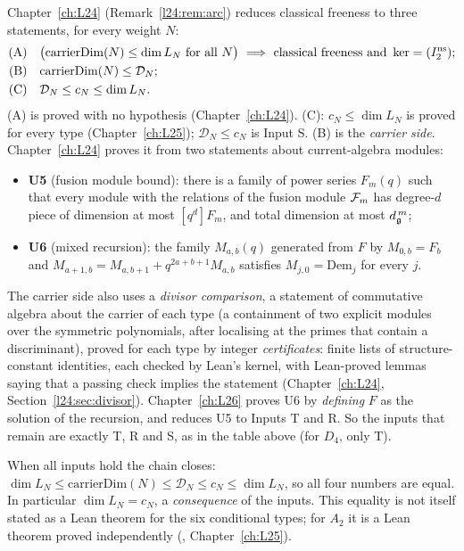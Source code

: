 \begin{remark}\label{l27:rem:arc}
Chapter~\ref{ch:L24} (Remark~\ref{l24:rem:arc}) reduces classical freeness to three statements, for every weight $N$:
\begin{align*}
\text{(A)}\quad & \bigl(\mathrm{carrierDim}(N)\le\dim L_N\ \text{for all }N\bigr)\ \Longrightarrow\ \text{classical freeness and}
\ \ker=(I_2^{\mathrm{ns}});\\
\text{(B)}\quad & \mathrm{carrierDim}(N)\le\mathcal D_N;\\
\text{(C)}\quad & \mathcal D_N\le c_N\le\dim L_N .
\end{align*}
(A) is proved with no hypothesis (Chapter~\ref{ch:L24}). (C): $c_N\le\dim L_N$ is proved for every type
(Chapter~\ref{ch:L25}); $\mathcal D_N\le c_N$ is Input S. (B) is the \emph{carrier side}. Chapter~\ref{ch:L24} proves it
from two statements about current-algebra modules:
\begin{itemize}
\item \textbf{U5} (fusion module bound): there is a family of power series $F_m(q)$ such that every module with the
  relations of the fusion module $\mathcal F_m$ has degree-$d$ piece of dimension at most $[q^d]F_m$, and total dimension at most
  $d_{\mathfrak g}^{\,m}$;
\item \textbf{U6} (mixed recursion): the family $M_{a,b}(q)$ generated from $F$ by $M_{0,b}=F_b$ and
  $M_{a+1,b}=M_{a,b+1}+q^{2a+b+1}M_{a,b}$ satisfies $M_{j,0}=\mathrm{Dem}_j$ for every $j$.
\end{itemize}
The carrier side also uses a \emph{divisor comparison}, a statement of commutative algebra about the carrier of each
type (a containment of two explicit modules over the symmetric polynomials, after localising at the primes that contain a
discriminant), proved for each type by integer \emph{certificates}: finite lists of structure-constant identities, each
checked by Lean's kernel, with Lean-proved lemmas saying that a passing check implies the statement
(Chapter~\ref{ch:L24}, Section~\ref{l24:sec:divisor}). Chapter~\ref{ch:L26} proves U6 by \emph{defining} $F$ as the solution
of the recursion, and reduces U5 to Inputs T and R. So the inputs that remain are exactly T, R and S, as in the table
above (for $D_4$, only T).

When all inputs hold the chain closes:
$\dim L_N\le\mathrm{carrierDim}(N)\le\mathcal D_N\le c_N\le\dim L_N$, so all four numbers are equal. In particular
$\dim L_N=c_N$, a \emph{consequence} of the inputs. This equality is not itself stated as a Lean theorem for the six
conditional types; for $A_2$ it is a Lean theorem proved independently (,
Chapter~\ref{ch:L25}).
\end{remark}

